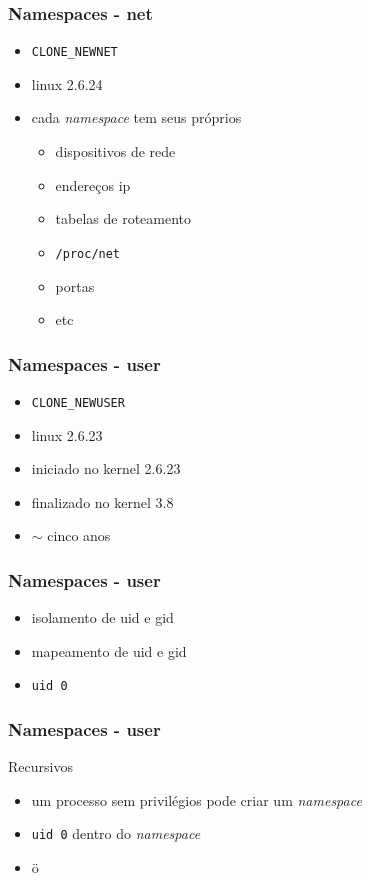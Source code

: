 \documentclass{beamer}
\begin{document}
\begin{frame}
    \frametitle{Namespaces - net}
    \begin{itemize}
        \item \texttt{CLONE\_NEWNET}
        \item linux 2.6.24
        \item cada \textit{namespace} tem seus próprios
            \begin{itemize}
                \item dispositivos de rede
                \item endereços ip
                \item tabelas de roteamento
                \item \texttt{/proc/net}
                \item portas
                \item etc
            \end{itemize}
    \end{itemize}
\end{frame}

\begin{frame}
    \frametitle{Namespaces - user}
    \begin{itemize}
        \item \texttt{CLONE\_NEWUSER}
        \item linux 2.6.23
        \item iniciado no kernel 2.6.23
        \item finalizado no kernel 3.8
        \item $\sim$ cinco anos
    \end{itemize}
\end{frame}

\begin{frame}
    \frametitle{Namespaces - user}
    \begin{itemize}
        \item isolamento de uid e gid
        \item mapeamento de uid e gid
        \item \texttt{uid 0}
    \end{itemize}
\end{frame}

\begin{frame}
    \frametitle{Namespaces - user}
    Recursivos
    \begin{itemize}
        \item um processo sem privilégios pode criar um \textit{namespace}
        \item \texttt{uid 0} dentro do \textit{namespace}
        \item ö
    \end{itemize}
\end{frame}
\end{document}
